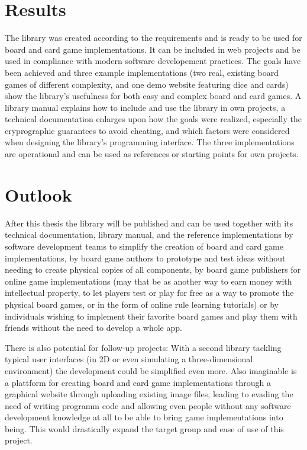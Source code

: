 \section*{Results}

The library was created according to the requirements and is ready to be used
for board and card game implementations. It can be included in web projects and
be used in compliance with modern software developement practices. The goals
have been achieved and three example implementations (two real, existing board
games of different complexity, and one demo website featuring dice and cards)
show the library's usefulness for both easy and complex board and card games. A
library manual explains how to include and use the library in own projects, a
technical documentation enlarges upon how the goals were realized, especially
the cryprographic guarantees to avoid cheating, and which factors were
considered when designing the library's programming interface. The three
implementations are operational and can be used as references or starting points
for own projects.

\section*{Outlook}

After this thesis the library will be published and can be used together with
its technical documentation, library manual, and the reference implementations
by software development teams to simplify the creation of board and card game
implementations, by board game authors to prototype and test ideas without
needing to create physical copies of all components, by board game publishers
for online game implementations (may that be as another way to earn money with
intellectual property, to let players test or play for free as a way to promote
the physical board games, or in the form of online rule learning tutorials) or
by individuals wishing to implement their favorite board games and play them
with friends without the need to develop a whole app.

There is also potential for follow-up projects: With a second library tackling
typical user interfaces (in 2D or even simulating a three-dimensional
environment) the development could be simplified even more. Also imaginable is a
plattform for creating board and card game implementations through a graphical
website through uploading existing image files, leading to evading the need of
writing programm code and allowing even people without any software development
knowledge at all to be able to bring game implementations into being. This would
drastically expand the target group and ease of use of this project.
